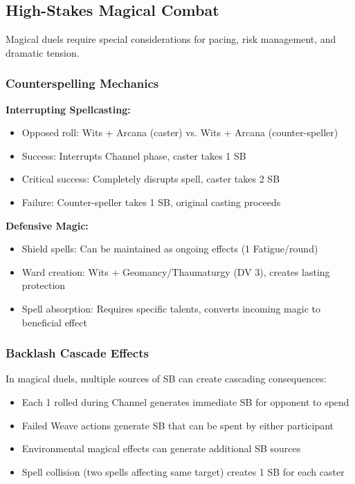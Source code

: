 \subsection{High-Stakes Magical Combat}

Magical duels require special considerations for pacing, risk management, and dramatic tension.

\subsubsection{Counterspelling Mechanics}
\textbf{Interrupting Spellcasting:}
\begin{itemize}[leftmargin=*]
    \item Opposed roll: Wits + Arcana (caster) vs. Wits + Arcana (counter-speller)
    \item Success: Interrupts Channel phase, caster takes 1 SB
    \item Critical success: Completely disrupts spell, caster takes 2 SB
    \item Failure: Counter-speller takes 1 SB, original casting proceeds
\end{itemize}

\textbf{Defensive Magic:}
\begin{itemize}[leftmargin=*]
    \item Shield spells: Can be maintained as ongoing effects (1 Fatigue/round)
    \item Ward creation: Wits + Geomancy/Thaumaturgy (DV 3), creates lasting protection
    \item Spell absorption: Requires specific talents, converts incoming magic to beneficial effect
\end{itemize}

\subsubsection{Backlash Cascade Effects}
In magical duels, multiple sources of SB can create cascading consequences:
\begin{itemize}[leftmargin=*]
    \item Each 1 rolled during Channel generates immediate SB for opponent to spend
    \item Failed Weave actions generate SB that can be spent by either participant
    \item Environmental magical effects can generate additional SB sources
    \item Spell collision (two spells affecting same target) creates 1 SB for each caster
\end{itemize}

